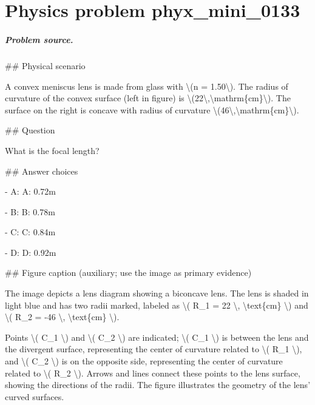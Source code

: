 
\chapter{Physics problem phyx\_mini\_0133}
\label{ch:PhyXMiniProblems_problem_phyx_mini_0133}

\paragraph{Problem source.}
\#\# Physical scenario

A convex meniscus lens is made from glass with \textbackslash{}(n = 1.50\textbackslash{}). The radius of curvature of the convex surface (left in figure) is \textbackslash{}(22\textbackslash{},\textbackslash{}mathrm\{cm\}\textbackslash{}). The surface on the right is concave with radius of curvature \textbackslash{}(46\textbackslash{},\textbackslash{}mathrm\{cm\}\textbackslash{}).

\#\# Question

What is the focal length?

\#\# Answer choices

- A: A: 0.72m

- B: B: 0.78m

- C: C: 0.84m

- D: D: 0.92m

\#\# Figure caption (auxiliary; use the image as primary evidence)

The image depicts a lens diagram showing a biconcave lens. The lens is shaded in light blue and has two radii marked, labeled as \textbackslash{}( R\_1 = 22 \textbackslash{}, \textbackslash{}text\{cm\} \textbackslash{}) and \textbackslash{}( R\_2 = -46 \textbackslash{}, \textbackslash{}text\{cm\} \textbackslash{}). 

Points \textbackslash{}( C\_1 \textbackslash{}) and \textbackslash{}( C\_2 \textbackslash{}) are indicated; \textbackslash{}( C\_1 \textbackslash{}) is between the lens and the divergent surface, representing the center of curvature related to \textbackslash{}( R\_1 \textbackslash{}), and \textbackslash{}( C\_2 \textbackslash{}) is on the opposite side, representing the center of curvature related to \textbackslash{}( R\_2 \textbackslash{}). Arrows and lines connect these points to the lens surface, showing the directions of the radii. The figure illustrates the geometry of the lens’ curved surfaces.

